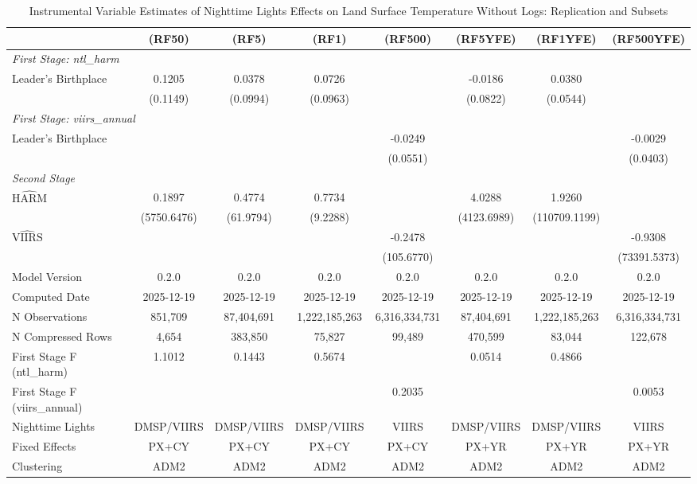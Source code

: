 \begin{table}[htbp]
\centering
\footnotesize
\caption{Instrumental Variable Estimates of Nighttime Lights Effects on Land Surface Temperature Without Logs: Replication and Subsets}
\begin{tabular}{lccccccc}
\toprule
 & (RF50) & (RF5) & (RF1) & (RF500) & (RF5YFE) & (RF1YFE) & (RF500YFE) \\
\midrule
\midrule
\multicolumn{8}{l}{\textit{First Stage: ntl\_harm}} \\
  Leader's Birthplace & 0.1205 & 0.0378 & 0.0726 &  & -0.0186 & 0.0380 &  \\
 & (0.1149) & (0.0994) & (0.0963) &  & (0.0822) & (0.0544) &  \\
\midrule
\multicolumn{8}{l}{\textit{First Stage: viirs\_annual}} \\
  Leader's Birthplace &  &  &  & -0.0249 &  &  & -0.0029 \\
 &  &  &  & (0.0551) &  &  & (0.0403) \\
\midrule
\multicolumn{8}{l}{\textit{Second Stage}} \\
$\hat{\text{HARM}}$ & 0.1897 & 0.4774 & 0.7734 &  & 4.0288 & 1.9260 &  \\
 & (5750.6476) & (61.9794) & (9.2288) &  & (4123.6989) & (110709.1199) &  \\
$\hat{\text{VIIRS}}$ &  &  &  & -0.2478 &  &  & -0.9308 \\
 &  &  &  & (105.6770) &  &  & (73391.5373) \\
\midrule
Model Version & 0.2.0 & 0.2.0 & 0.2.0 & 0.2.0 & 0.2.0 & 0.2.0 & 0.2.0 \\
Computed Date & 2025-12-19 & 2025-12-19 & 2025-12-19 & 2025-12-19 & 2025-12-19 & 2025-12-19 & 2025-12-19 \\
N Observations & 851,709 & 87,404,691 & 1,222,185,263 & 6,316,334,731 & 87,404,691 & 1,222,185,263 & 6,316,334,731 \\
N Compressed Rows & 4,654 & 383,850 & 75,827 & 99,489 & 470,599 & 83,044 & 122,678 \\
First Stage F (ntl\_harm) & 1.1012 & 0.1443 & 0.5674 &  & 0.0514 & 0.4866 &  \\
First Stage F (viirs\_annual) &  &  &  & 0.2035 &  &  & 0.0053 \\
\midrule
Nighttime Lights & DMSP/VIIRS & DMSP/VIIRS & DMSP/VIIRS & VIIRS & DMSP/VIIRS & DMSP/VIIRS & VIIRS \\
Fixed Effects & PX+CY & PX+CY & PX+CY & PX+CY & PX+YR & PX+YR & PX+YR \\
Clustering & ADM2 & ADM2 & ADM2 & ADM2 & ADM2 & ADM2 & ADM2 \\

\end{tabular}
\end{table}
